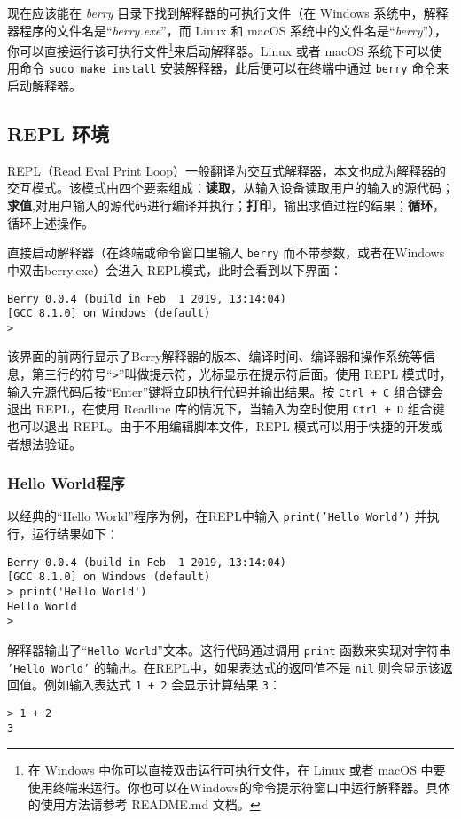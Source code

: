 现在应该能在 \textsl{berry} 目录下找到解释器的可执行文件（在 Windows 系统中，解释器程序的文件名是``\textsl{berry.exe}''，而 Linux 和 macOS 系统中的文件名是``\textsl{berry}''），你可以直接运行该可执行文件\footnote{在 Windows 中你可以直接双击运行可执行文件，在 Linux 或者 macOS 中要使用终端来运行。你也可以在Windows的命令提示符窗口中运行解释器。具体的使用方法请参考 README.md 文档。}来启动解释器。Linux 或者 macOS 系统下可以使用命令 \texttt{sudo make install} 安装解释器，此后便可以在终端中通过 \texttt{berry} 命令来启动解释器。

\subsection{REPL 环境}

REPL（Read Eval Print Loop）一般翻译为交互式解释器，本文也成为解释器的交互模式。该模式由四个要素组成：\textbf{读取}，从输入设备读取用户的输入的源代码；\textbf{求值},对用户输入的源代码进行编译并执行；\textbf{打印}，输出求值过程的结果；\textbf{循环}，循环上述操作。

直接启动解释器（在终端或命令窗口里输入 \texttt{berry} 而不带参数，或者在Windows中双击berry.exe）会进入 REPL模式，此时会看到以下界面：
\begin{lstlisting}[language=berry, numbers=none]
Berry 0.0.4 (build in Feb  1 2019, 13:14:04)
[GCC 8.1.0] on Windows (default)
>
\end{lstlisting}
该界面的前两行显示了Berry解释器的版本、编译时间、编译器和操作系统等信息，第三行的符号``\texttt{>}''叫做提示符，光标显示在提示符后面。使用 REPL 模式时，输入完源代码后按``Enter''键将立即执行代码并输出结果。按 \texttt{Ctrl\,+\,C} 组合键会退出 REPL，在使用 Readline 库的情况下，当输入为空时使用 \texttt{Ctrl\,+\,D} 组合键也可以退出 REPL。由于不用编辑脚本文件，REPL 模式可以用于快捷的开发或者想法验证。

\subsubsection{Hello World程序}

以经典的``Hello World''程序为例，在REPL中输入 \texttt{print('Hello World')} 并执行，运行结果如下：
\begin{lstlisting}[language=berry, numbers=none]
Berry 0.0.4 (build in Feb  1 2019, 13:14:04)
[GCC 8.1.0] on Windows (default)
> print('Hello World')
Hello World
>
\end{lstlisting}
解释器输出了``\texttt{Hello World}''文本。这行代码通过调用 \texttt{print} 函数来实现对字符串 \texttt{'Hello World'} 的输出。在REPL中，如果表达式的返回值不是 \texttt{nil} 则会显示该返回值。例如输入表达式 \texttt{1 + 2} 会显示计算结果 \texttt{3}：
\begin{lstlisting}[language=berry, numbers=none]
> 1 + 2
3
\end{lstlisting}

